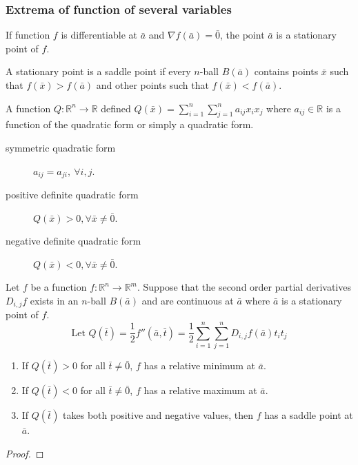 \subsubsection{Extrema of function of several variables}
\begin{definition}
	If function $f$ is differentiable at $\bar{a}$ and $\nabla f(\bar{a}) = \bar{0}$, the point $\bar{a}$ is a stationary point of $f$.
\end{definition}

\begin{definition}
	A stationary point is a saddle point if every $n$-ball $B(\bar{a})$ contains points $\bar{x}$ such that $f(\bar{x}) > f(\bar{a})$ and other points such that $f(\bar{x}) < f(\bar{a})$.
\end{definition}

\begin{definition}
	A function $Q : \mathbb{R}^n \to \mathbb{R}$ defined $Q(\bar{x}) = \sum_{i=1}^n \sum_{j=1}^n a_{ij}x_ix_j$ where $a_{ij} \in \mathbb{R}$ is a function of the quadratic form or simply a quadratic form.
\begin{description}
	\item[symmetric quadratic form] $a_{ij} = a_{ji},\ \forall i,j$. 
	\item[positive definite quadratic form] $Q(\bar{x}) > 0, \forall \bar{x} \ne \bar{0}$. 
	\item[negative definite quadratic form] $Q(\bar{x}) < 0, \forall \bar{x} \ne \bar{0}$. 
\end{description}
\end{definition}

\begin{theorem}
	Let $f$ be a function $f : \mathbb{R}^n \to \mathbb{R}^m$.
	Suppose that the second order partial derivatives $D_{i,j}f$ exists in an $n$-ball $B(\bar{a})$ and are continuous at $\bar{a}$ where $\bar{a}$ is a stationary point of $f$.
	\[ \text{Let } Q(\bar{t}) = \frac{1}{2} f''(\bar{a},\bar{t}) = \frac{1}{2} \sum_{i = 1}^n \sum_{j = 1}^n D_{i,j} f(\bar{a})t_it_j \]
\begin{enumerate}
	\item If $Q(\bar{t}) > 0$ for all $\bar{t} \ne \bar{0}$, $f$ has a relative minimum at $\bar{a}$.
	\item If $Q(\bar{t}) < 0$ for all $\bar{t} \ne \bar{0}$, $f$ has a relative maximum at $\bar{a}$.
	\item If $Q(\bar{t})$ takes both positive and negative values, then $f$ has a saddle point at $\bar{a}$.
\end{enumerate}
\end{theorem}
\begin{proof}
\end{proof}

